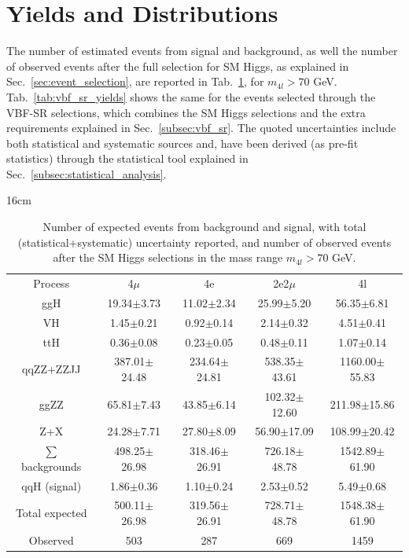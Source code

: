 \section{Yields and Distributions}
The number of estimated events from signal and background, as well the number of observed events after the full selection for SM Higgs, as explained in Sec.~\ref{sec:event_selection}, are reported in Tab.~\ref{tab:sm_higgs_final_yields}, for $m_{4l} > 70$ GeV. Tab.~\ref{tab:vbf_sr_yields} shows the same for the events selected through the VBF-SR selections, which combines the SM Higgs selections and the extra requirements explained in Sec.~\ref{subsec:vbf_sr}. The quoted uncertainties include both statistical and systematic sources and, have been derived (as pre-fit statistics) through the statistical tool explained in Sec.~\ref{subsec:statistical_analysis}.

\begin{table}[hbtp]{16cm}
	\caption{Number of expected events from background and signal, with total (statistical+systematic) uncertainty reported, and number of observed events after the SM Higgs selections in the mass range $m_{4l} > 70$ GeV.}
	\centering
	\begin{tabular}{c|c|c|c|c}
		\hline
		\rowcolor{light_gray}
		Process                     & 4$\mu$           & 4e               & 2e2$\mu$         & 4l\\
		ggH                         &  19.34$\pm$3.73  &  11.02$\pm$2.34  &  25.99$\pm$5.20  &   56.35$\pm$6.81\\
		VH                          &   1.45$\pm$0.21  &   0.92$\pm$0.14  &   2.14$\pm$0.32  &    4.51$\pm$0.41\\
		ttH                         &   0.36$\pm$0.08  &   0.23$\pm$0.05  &   0.48$\pm$0.11  &    1.07$\pm$0.14\\
		qqZZ+ZZJJ                   & 387.01$\pm$24.48 & 234.64$\pm$24.81 & 538.35$\pm$43.61 & 1160.00$\pm$55.83\\
		ggZZ                        &  65.81$\pm$7.43  &  43.85$\pm$6.14  & 102.32$\pm$12.60 &  211.98$\pm$15.86\\
		Z+X                         &  24.28$\pm$7.71  &  27.80$\pm$8.09  &  56.90$\pm$17.09 &  108.99$\pm$20.42\\
		\hline
		$\sum$ backgrounds          & 498.25$\pm$26.98 & 318.46$\pm$26.91 & 726.18$\pm$48.78 & 1542.89$\pm$61.90\\
		\hline
		qqH (signal)                &   1.86$\pm$0.36  &   1.10$\pm$0.24  &   2.53$\pm$0.52  &    5.49$\pm$0.68\\
		\hline
		Total expected              & 500.11$\pm$26.98 & 319.56$\pm$26.91 & 728.71$\pm$48.78 & 1548.38$\pm$61.90\\
		\hline
		Observed                    & 503              & 287              & 669              & 1459\\
		\hline
	\end{tabular}
	\label{tab:sm_higgs_final_yields}
\end{table}

